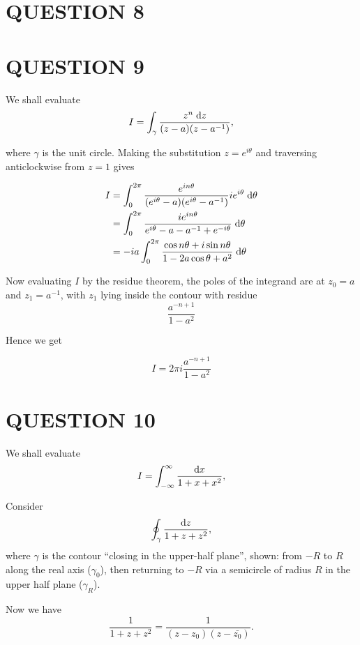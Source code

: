 \documentclass[a4paper]{article}
\begin{document}
\section{QUESTION 8}
\section{QUESTION 9}

 We shall evaluate
\[
I = \int_{\gamma} \frac{z^{n} \; \mathrm{d} z}{(z-a)(z-a^{-1})},
\]

where $ \gamma $ is the unit circle. Making the substitution $ z = e^{i \theta} $ and traversing anticlockwise from $ z = 1 $ gives

\begin{align*}
I & = \int_{0}^{2\pi}  \frac{e^{i n \theta}}{(e^{i \theta} - a)(e^{i \theta} - a^{-1})} i e^{i \theta} \; \mathrm{d} \theta  \\
& = \int_{0}^{2\pi} \frac{ i e^{i n \theta}}{e^{ i \theta} - a - a^{-1}  + e^{-i \theta} }  \; \mathrm{d} \theta \\
& = - ia \int_{0}^{2\pi} \frac{ \cos n \theta + i \sin n \theta}{1   - 2 a \cos \theta +  a^{2}    }  \; \mathrm{d} \theta \\
\end{align*}

Now evaluating $ I $ by the residue theorem, the poles of the integrand are at $z_0 = a $ and $z_1 = a^{-1} $, with $ z_{1} $ lying inside the contour with residue
\[
\frac{a^{-n+1}}{1-a^{2}}
\]

Hence we get

\[
I = 2\pi i \frac{a^{-n+1}}{1-a^{2}}
\]





\section{QUESTION 10}

 We shall evaluate
\[
I = \int_{-\infty}^{\infty} \frac{\mathrm{d} x}{1 + x + x^2},
\]

Consider
\[
\oint_\gamma \frac{\mathrm{d} z}{1 + z + z^2},
\]
where $\gamma$ is the contour ``closing in the upper-half plane'', shown: from $-R$ to $R$ along the real axis ($\gamma_0$), then returning to $-R$ via a semicircle of radius $R$ in the upper half plane ($\gamma_R$).
\begin{center}
\end{center}
Now we have
\[
\frac{1}{1 + z + z^2} = \frac{1}{(z - z_{0})(z - \bar{z_{0}})}.
\]
\end{document}
